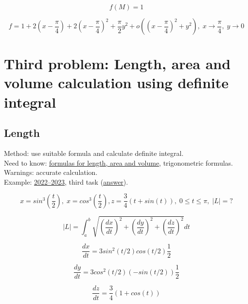 \documentclass{article}
\begin{document}
\begin{equation*}
    f(M) = 1
\end{equation*}

\begin{equation}
    f =1 + 2(x-\frac{\pi}{4}) + 2(x-\frac{\pi}{4})^2 + \frac{\pi}{2}y^2 + o((x-\frac{\pi}{4})^2+y^2), \; x \rightarrow \frac{\pi}{4}, \; y \rightarrow 0
\end{equation}


\newpage
\section{Third problem:  Length, area and volume calculation using definite integral}

\subsection{Length}
Method: use suitable formula and calculate definite integral. \\
Need to know: \hyperlink{3.1}{formulas for length, area and volume}, trigonometric formulas. \\
Warnings: accurate calculation. \\
Example: \href{https://old.mipt.ru/education/chair/mathematics/exams/exams/2022-23/%D0%9C%D0%90%D0%98%D0%B8%D0%A0_%D0%92_23.pdf}{2022–2023}, third task (\href{https://old.mipt.ru/education/chair/mathematics/exams/exams/2022-23/%D0%9C%D0%90%D0%98%D0%B8%D0%A0_%D0%92_23%D0%BE%D1%82%D0%B2%D0%B5%D1%82%D1%8B.pdf}{answer}).

\begin{equation}
    x = sin^3(\frac{t}{2}), \; x = cos^3(\frac{t}{2}), z = \frac{3}{4}(t+sin(t)), \; 0 \leq t \leq \pi, \; |L|=?
\end{equation}

\begin{equation}
    |L| = \int_{a}^{b} \sqrt{(\frac{dx}{dt})^2+(\frac{dy}{dt})^2+(\frac{dz}{dt})^2}dt
\end{equation}

\begin{equation*}
    \frac{dx}{dt} = 3sin^2(t/2) cos(t/2) \frac{1}{2}
\end{equation*}

\begin{equation*}
    \frac{dy}{dt} = 3cos^2(t/2) (-sin(t/2)) \frac{1}{2}
\end{equation*}

\begin{equation*}
    \frac{dz}{dt} = \frac{3}{4}(1+cos(t))
\end{equation*}
\end{document}
